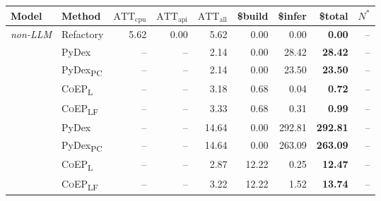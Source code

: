\begin{tabular}{llrrr rrr r}
\toprule
Model & Method & $\mathrm{ATT}_{\mathrm{cpu}}$ & $\mathrm{ATT}_{\mathrm{api}}$ & $\mathrm{ATT}_{\mathrm{all}}$ & \$build & \$infer & \textbf{\$total} & $N^{*}$ \\
\midrule
\emph{non-LLM} & Refactory & 5.62 & 0.00 & 5.62 & 0.00 & 0.00 & \textbf{0.00} & -- \\
\midrule
{}
 & PyDex & -- & -- & 2.14 & 0.00 & 28.42 & \textbf{28.42} & -- \\
 & PyDex\textsubscript{PC} & -- & -- & 2.14 & 0.00 & 23.50 & \textbf{23.50} & -- \\
 & \textsc{CoEP}\textsubscript{L} & -- & -- & 3.18 & 0.68 & 0.04 & \textbf{0.72} & -- \\
 & \textsc{CoEP}\textsubscript{LF} & -- & -- & 3.33 & 0.68 & 0.31 & \textbf{0.99} & -- \\
\midrule
{}
 & PyDex & -- & -- & 14.64 & 0.00 & 292.81 & \textbf{292.81} & -- \\
 & PyDex\textsubscript{PC} & -- & -- & 14.64 & 0.00 & 263.09 & \textbf{263.09} & -- \\
 & \textsc{CoEP}\textsubscript{L} & -- & -- & 2.87 & 12.22 & 0.25 & \textbf{12.47} & -- \\
 & \textsc{CoEP}\textsubscript{LF} & -- & -- & 3.22 & 12.22 & 1.52 & \textbf{13.74} & -- \\
\bottomrule
\end{tabular}
